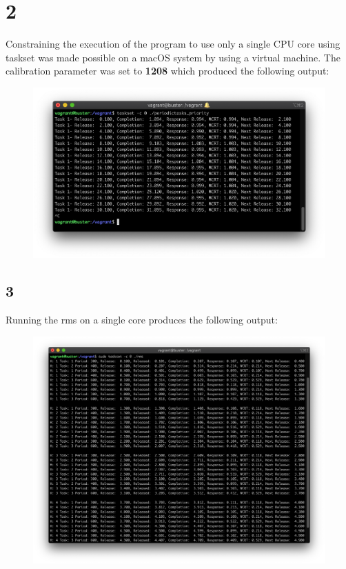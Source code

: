 \documentclass[12pt]{article}
\begin{document}
\section*{2}
Constraining the execution of the program to use only a single CPU core using taskset was made possible on a macOS system by using a virtual machine. The calibration parameter was set to \textbf{1208} which produced the following output:
\begin{figure}[H]
    \includegraphics[width=\linewidth]{2-periodictasks-priority-output}
\end{figure}
\subsection*{3}

Running the rms on a single core produces the following output:
\begin{figure}[H]
    \includegraphics[width=\linewidth]{3-rms-output}
\end{figure}
\end{document}
